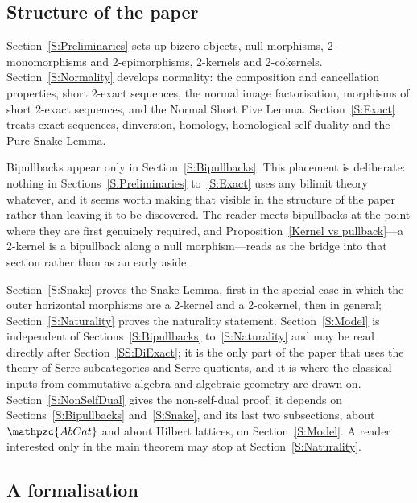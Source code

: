 \documentclass[reqno,a4paper]{amsart}
\numberwithin{equation}{section}
\theoremstyle{plain}
\theoremstyle{definition}
\def\nameit#1{\textrm{#1}~}
\def\prox{\nameit{Proposition}}
\newcommand{\catfont}[1]{\ensuremath{\mathpzc{#1}}\xspace}
\newcommand{\AbCat}{\catfont{AbCat}}
\renewcommand{\1}{\onecat{1}}
\begin{document}
\subsection{Structure of the paper}\label{SS:Structure}

Section~\ref{S:Preliminaries} sets up bizero objects, null morphisms, 2-monomorphisms and 2-epimorphisms, 2-kernels and 2-cokernels. Section~\ref{S:Normality} develops normality: the composition and cancellation properties, short 2-exact sequences, the normal image factorisation, morphisms of short 2-exact sequences, and the Normal Short Five Lemma. Section~\ref{S:Exact} treats exact sequences, dinversion, homology, homological self-duality and the Pure Snake Lemma.

Bipullbacks appear only in Section~\ref{S:Bipullbacks}. This placement is deliberate: nothing in Sections~\ref{S:Preliminaries} to~\ref{S:Exact} uses any bilimit theory whatever, and it seems worth making that visible in the structure of the paper rather than leaving it to be discovered. The reader meets bipullbacks at the point where they are first genuinely required, and \prox\ref{Kernel vs pullback}---a 2-kernel is a bipullback along a null morphism---reads as the bridge into that section rather than as an early aside.

Section~\ref{S:Snake} proves the Snake Lemma, first in the special case in which the outer horizontal morphisms are a 2-kernel and a 2-cokernel, then in general; Section~\ref{S:Naturality} proves the naturality statement. Section~\ref{S:Model} is independent of Sections~\ref{S:Bipullbacks} to~\ref{S:Naturality} and may be read directly after Section~\ref{SS:DiExact}; it is the only part of the paper that uses the theory of Serre subcategories and Serre quotients, and it is where the classical inputs from commutative algebra and algebraic geometry are drawn on. Section~\ref{S:NonSelfDual} gives the non-self-dual proof; it depends on Sections~\ref{S:Bipullbacks} and~\ref{S:Snake}, and its last two subsections, about \(\AbCat\) and about Hilbert lattices, on Section~\ref{S:Model}. A reader interested only in the main theorem may stop at Section~\ref{S:Naturality}.

\subsection{A formalisation}\label{SS:Formalisation}
\end{document}

